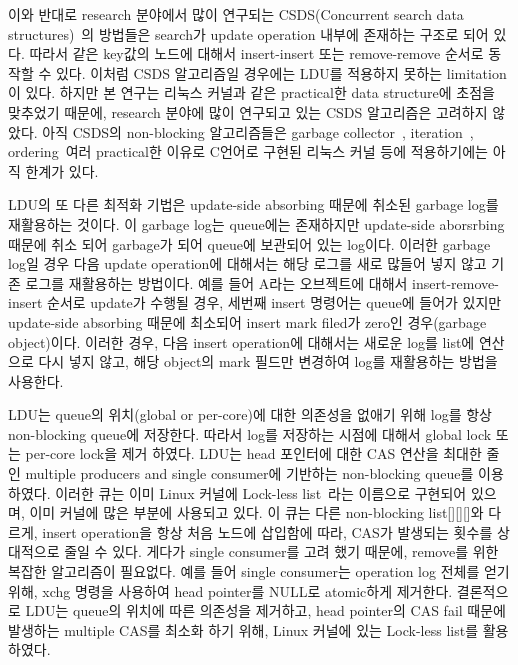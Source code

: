 이와 반대로 research 분야에서 많이 연구되는 CSDS(Concurrent search data
structures)~\cite{David2015ASYNCHRONIZED}의 방법들은 search가 update operation 내부에
존재하는 구조로 되어 있다.
따라서 같은 key값의 노드에 대해서 insert-insert 또는 remove-remove 순서로 동작할 수 있다.
이처럼 CSDS 알고리즘일 경우에는 LDU를 적용하지 못하는 limitation이 있다.
하지만 본 연구는 리눅스 커널과 같은 practical한 data structure에 초점을 맞추었기 때문에, 
research 분야에 많이 연구되고 있는 CSDS 알고리즘은 고려하지 않았다.
아직 CSDS의 non-blocking 알고리즘들은 garbage collector~\cite{AlBahra2013NAS},
iteration~\cite{petrank2013lock}, ordering~\cite{zhang2013practical}여러
practical한 이유로 C언어로 구현된 리눅스 커널 등에 적용하기에는 아직 한계가 있다.
\else
\fi


\ifkor
LDU의 또 다른 최적화 기법은 update-side absorbing 때문에 취소된 garbage log를 재활용하는 것이다.
이 garbage log는 queue에는 존재하지만 update-side aborsrbing 때문에 취소 되어 garbage가 되어 queue에
보관되어 있는 log이다. 
이러한 garbage log일 경우 다음 update operation에 대해서는 해당 로그를 새로 많들어 넣지 않고 기존 로그를 재활용하는
방법이다.
예를 들어 A라는 오브젝트에 대해서 insert-remove-insert 순서로 update가 수행될 경우, 세번째 insert 명령어는
queue에 들어가 있지만 update-side absorbing 때문에 최소되어 insert mark filed가 zero인
경우(garbage object)이다.
이러한 경우, 다음 insert operation에 대해서는 새로운 log를 list에 연산으로 다시 넣지 않고, 해당 object의 mark
필드만 변경하여 log를 재활용하는 방법을 사용한다.
\else
\fi


\ifkor
LDU는 queue의 위치(global or per-core)에 대한 의존성을 없애기 위해 log를 항상 non-blocking queue에
저장한다.
따라서 log를 저장하는 시점에 대해서 global lock 또는 per-core lock을 제거 하였다.
LDU는 head 포인터에 대한 CAS 연산을 최대한 줄인 multiple producers and single
consumer에 기반하는 non-blocking queue를 이용하였다.
이러한 큐는 이미 Linux 커널에 Lock-less list~\cite{HuangLocklessList}라는 이름으로 구현되어 있으며, 이미
커널에 많은 부분에 사용되고 있다.
이 큐는 다른 non-blocking list[][][]와 다르게, insert operation을 항상 처음 노드에 삽입함에
따라, CAS가 발생되는 횟수를 상대적으로 줄일 수 있다.
게다가 single consumer를 고려 했기 때문에, remove를 위한 복잡한 알고리즘이 필요없다. 
예를 들어 single consumer는 operation log 전체를 얻기 위해, xchg 명령을 사용하여 head pointer를
NULL로 atomic하게 제거한다. 
결론적으로 LDU는 queue의 위치에 따른 의존성을 제거하고, head pointer의
CAS fail 때문에 발생하는 multiple CAS를 최소화 하기 위해, Linux 커널에 있는 Lock-less list를 활용 하였다.
\else
\fi



